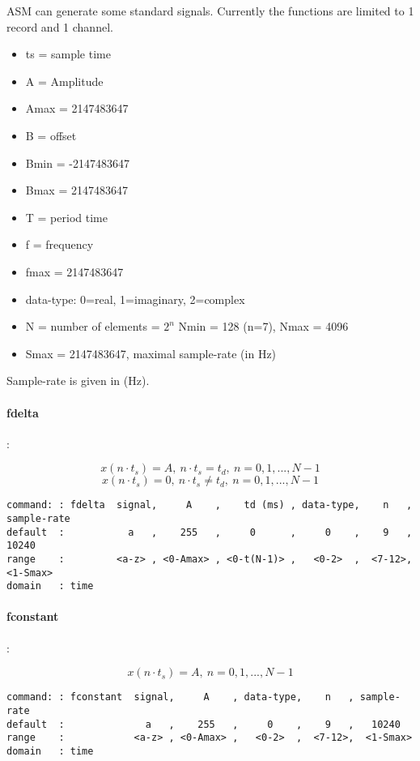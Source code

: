 \documentclass{report}
\newcommand{\bc}{\scriptsize}
\newcommand{\ec}{\normalsize}
\begin{document}
ASM can generate some standard signals.
Currently the functions are limited to 1 record and 1 channel.

\begin{itemize}
\item ts = sample time
\item A = Amplitude
\item Amax = 2147483647
\item B = offset
\item Bmin = -2147483647
\item Bmax = 2147483647
\item T = period time
\item f = frequency
\item fmax = 2147483647
\item data-type: 0=real, 1=imaginary, 2=complex
\item N = number of elements = $2^{n}$
Nmin = 128 (n=7), Nmax = 4096
\item Smax = 2147483647, maximal sample-rate (in Hz)
\end{itemize}

Sample-rate is given in (Hz).

\paragraph{fdelta}:

\[ x(n \cdot t_{s}) = A,~ n \cdot t_{s} = t_{d},~ n=0,1,...,N-1 \]
\[ x(n \cdot t_{s}) = 0,~ n \cdot t_{s} \neq t_{d},~ n=0,1,...,N-1 \]

\bc
\begin{verbatim}
command: : fdelta  signal,     A    ,    td (ms) , data-type,    n   , sample-rate
default  :           a   ,    255   ,     0      ,     0    ,    9   ,   10240
range    :         <a-z> , <0-Amax> , <0-t(N-1)> ,   <0-2>  ,  <7-12>,  <1-Smax>
domain   : time
\end{verbatim}
\ec

\paragraph{fconstant}:

\[ x(n \cdot t_{s}) = A,~ n=0,1,...,N-1 \]
\bc
\begin{verbatim}
command: : fconstant  signal,     A    , data-type,    n   , sample-rate
default  :              a   ,    255   ,     0    ,    9   ,   10240
range    :            <a-z> , <0-Amax> ,   <0-2>  ,  <7-12>,  <1-Smax>
domain   : time
\end{verbatim}
\ec
\end{document}
